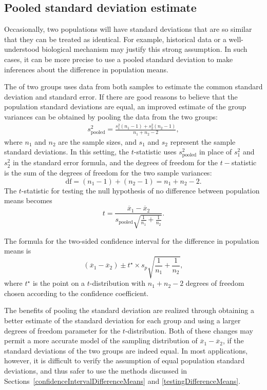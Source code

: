

\textD{\newpage}


\subsection{Pooled standard deviation estimate}
\label{pooledStandardDeviations}

Occasionally, two populations will have standard deviations that are so similar that they can be treated as identical. For example, historical data or a well-understood biological mechanism may justify this strong assumption. In such cases, it can be more precise to use a pooled standard deviation to make inferences about the difference in population means.

The  of two groups uses data from both samples to estimate the common standard deviation and standard error. If there are good reasons to believe that the population standard deviations are equal, an improved estimate of the group variances can be obtained by pooling the data from the two groups:
\begin{align*}
s_{\text{pooled}}^2 = \frac{s_1^2 (n_1-1) + s_2^2 (n_2-1)}{n_1 + n_2 - 2},
\end{align*}
where $n_1$ and $n_2$ are the sample sizes, and $s_1$ and $s_2$ represent the sample standard deviations. In this setting, the $t$-statistic uses $s_{\text{pooled}}^2$ in place of $s_1^2$ and $s_2^2$ in the standard error formula, and the degrees of freedom for the $t-$statistic is the sum of the degrees of freedom for the two sample variances:
\[
\text{df} = (n_1 - 1) + (n_2 - 1) = n_1 + n_2 - 2.
\]
The $t$-statistic for testing the null hypothesis of no difference between population means becomes 
\[
 t = \frac{\overline{x}_1 - \overline{x}_2}{s_{\text{pooled}}\sqrt{\frac{1}{n_1} + \frac{1}{n_2}}}. 
\]

The formula for the two-sided confidence interval for the difference in population means is
\[
(\overline{x}_1 - \overline{x}_2) \pm t^{\star} \times s_p \sqrt{\frac{1}{n_1} + \frac{1}{n_2}},
\]
where $t^{\star}$ is the point on a $t$-distribution with $n_1 + n_2 -2$ degrees of freedom chosen according to the confidence coefficient.

The benefits of pooling the standard deviation are realized through obtaining a better estimate of the standard deviation for each group and using a larger degrees of freedom parameter for the $t$-distribution. Both of these changes may permit a more accurate model of the sampling distribution of $\overline{x}_1 - \overline{x}_2$, if the standard deviations of the two groups are indeed equal.  In most applications, however, it is difficult to verify the assumption of equal population standard deviations, and thus safer to use the methods discussed in Sections~\ref{confidenceIntervalDifferenceMeans} and \ref{testingDifferenceMeans}.



